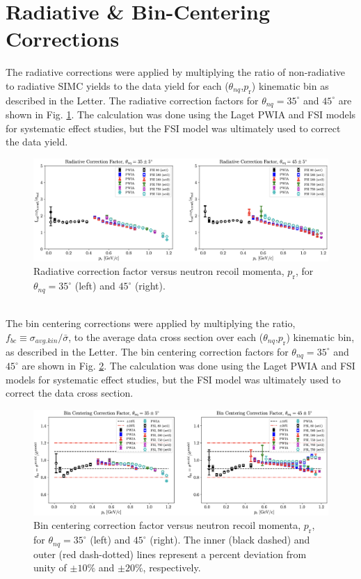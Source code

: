 \documentclass[aps, prl]{revtex4-2}  %
\begin{document}
\section{\large Radiative \& Bin-Centering Corrections}
\noindent The radiative corrections were applied by multiplying the ratio of non-radiative to radiative SIMC yields to the data yield for each ($\theta_{nq}$,$p_{\mathrm{r}}$)
kinematic bin as described in the Letter. The radiative correction factors for $\theta_{nq}=35^{\circ}$ and $45^{\circ}$ are shown in Fig. \ref{fig:fig9}. The calculation was done using the
Laget PWIA and FSI models for systematic effect studies, but the FSI model was ultimately used to correct the data yield.
\begin{figure}[!h]
\includegraphics[scale=0.40]{plots/RC_factor.png}
\caption{Radiative correction factor versus neutron recoil momenta, $p_{\mathrm{r}}$, for $\theta_{nq}=35^{\circ}$ (left) and $45^{\circ}$ (right). }
\label{fig:fig9}
\end{figure}\\
The bin centering corrections were applied by multiplying the ratio, $f_{bc} \equiv \sigma_{avg.kin}/\bar{\sigma}$, to the average data cross section over each ($\theta_{nq}$,$p_{\mathrm{r}}$)
kinematic bin, as described in the Letter. The bin centering correction factors for $\theta_{nq}=35^{\circ}$ and $45^{\circ}$ are shown in
Fig. \ref{fig:fig10}. The calculation was done using the Laget PWIA and FSI models for systematic effect studies, but the FSI model was ultimately used to correct the data cross section.
\begin{figure}[!h]
\includegraphics[scale=0.40]{plots/BC_factor.png}
\caption{Bin centering correction factor versus neutron recoil momenta, $p_{\mathrm{r}}$, for $\theta_{nq}=35^{\circ}$ (left) and $45^{\circ}$ (right).
  The inner (black dashed) and outer (red dash-dotted) lines represent a percent deviation from unity of $\pm10\%$ and $\pm20\%$, respectively.}
\label{fig:fig10}
\end{figure}
\end{document}

